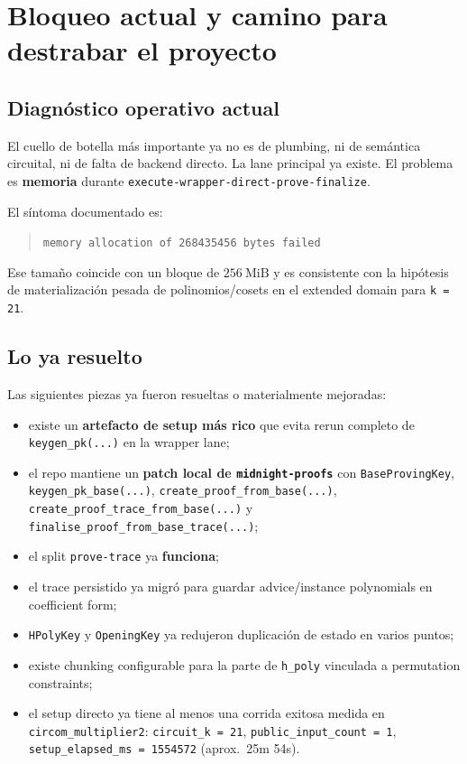\documentclass[11pt,a4paper]{article}
\begin{document}
\section{Bloqueo actual y camino para destrabar el proyecto}

\subsection{Diagn\'ostico operativo actual}

El cuello de botella m\'as importante ya no es de plumbing, ni de sem\'antica circuital, ni de falta de
backend directo. La lane principal ya existe. El problema es \textbf{memoria} durante
\texttt{execute-wrapper-direct-prove-finalize}.

El s\'intoma documentado es:

\begin{quote}
\texttt{memory allocation of 268435456 bytes failed}
\end{quote}

Ese tama\~no coincide con un bloque de \(256\ \text{MiB}\) y es consistente con la hip\'otesis
de materializaci\'on pesada de polinomios/cosets en el extended domain para \texttt{k = 21}.

\subsection{Lo ya resuelto}

Las siguientes piezas ya fueron resueltas o materialmente mejoradas:

\begin{itemize}
  \item existe un \textbf{artefacto de setup m\'as rico} que evita rerun completo de \texttt{keygen\_pk(...)} en la wrapper lane;
  \item el repo mantiene un \textbf{patch local de \texttt{midnight-proofs}} con
  \texttt{BaseProvingKey}, \texttt{keygen\_pk\_base(...)},
  \texttt{create\_proof\_from\_base(...)},
  \texttt{create\_proof\_trace\_from\_base(...)} y
  \texttt{finalise\_proof\_from\_base\_trace(...)};
  \item el split \texttt{prove-trace} ya \textbf{funciona};
  \item el trace persistido ya migr\'o para guardar advice/instance polynomials en coefficient form;
  \item \texttt{HPolyKey} y \texttt{OpeningKey} ya redujeron duplicaci\'on de estado en varios puntos;
  \item existe chunking configurable para la parte de \texttt{h\_poly} vinculada a permutation constraints;
  \item el setup directo ya tiene al menos una corrida exitosa medida en \texttt{circom\_multiplier2}:
  \texttt{circuit\_k = 21}, \texttt{public\_input\_count = 1},
  \texttt{setup\_elapsed\_ms = 1554572} (aprox.\ 25m 54s).
\end{itemize}
\end{document}
